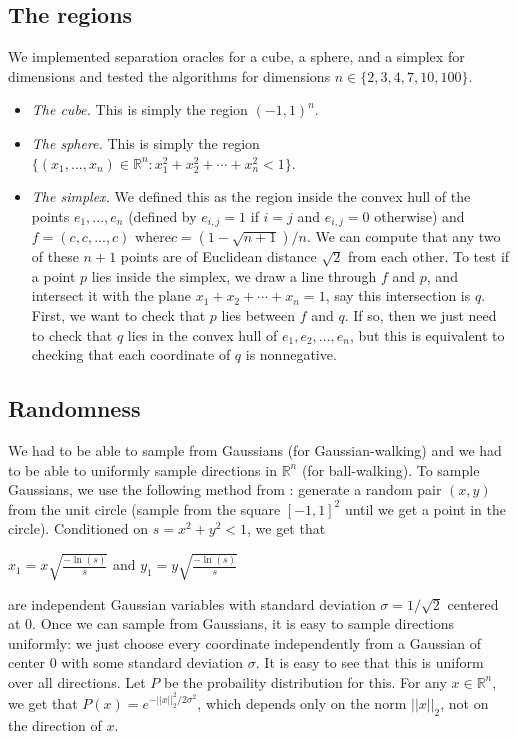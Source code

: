 \documentclass[11pt]{article}
\begin{document}
\subsection{The regions}

We implemented separation oracles for a cube, a sphere, and a simplex for dimensions and tested the algorithms for dimensions $n\in\{2,3,4,7,10,100\}$.
\begin{itemize}
\item \emph{The cube.} This is simply the region $(-1,1)^n$.
\item \emph{The sphere.} This is simply the region $\{(x_1,...,x_n)\in\mathbb{R}^n : x_1^2 + x_2^2 + \cdots + x_n^2 < 1\}$.
\item \emph{The simplex.} We defined this as the region inside the convex hull of the points $e_1, ..., e_n$ (defined by $e_{i,j} = 1$ if $i=j$ and $e_{i,j} = 0$ otherwise) and $f = (c,c,...,c)$ where\linebreak $c = (1 - \sqrt{n + 1}) / n$. We can compute that any two of these $n+1$ points are of Euclidean distance $\sqrt{2}$ from each other. To test if a point $p$ lies inside the simplex, we draw a line through $f$ and $p$, and intersect it with the plane $x_1 + x_2 + \cdots + x_n = 1$, say this intersection is $q$. First, we want to check that $p$ lies between $f$ and $q$. If so, then we just need to check that $q$ lies in the convex hull of $e_1,e_2,...,e_n$, but this is equivalent to checking that each coordinate of $q$ is nonnegative.
\end{itemize}

\subsection{Randomness}

We had to be able to sample from Gaussians (for Gaussian-walking) and we had to be able to uniformly sample directions in $\mathbb{R}^n$ (for ball-walking). To sample Gaussians, we use the following method from \cite{Marsaglia}: generate a random pair $(x,y)$ from the unit circle (sample from the square $[-1,1]^2$ until we get a point in the circle). Conditioned on $s = x^2 + y^2 < 1$, we get that
\begin{center}
$\displaystyle x_1 = x\sqrt{\frac{-\ln(s)}{s}}$ and $\displaystyle y_1 = y\sqrt{\frac{-\ln(s)}{s}}$
\end{center}
are independent Gaussian variables with standard deviation $\sigma = 1/\sqrt{2}$ centered at $0$. Once we can sample from Gaussians, it is easy to sample directions uniformly: we just choose every coordinate independently from a Gaussian of center $0$ with some standard deviation $\sigma$. It is easy to see that this is uniform over all directions. Let $P$ be the probaility distribution for this. For any $x\in\mathbb{R}^n$, we get that $P(x) = e^{-||x||_2^2 / 2\sigma^2}$, which depends only on the norm $||x||_2$, not on the direction of $x$.
\end{document}
